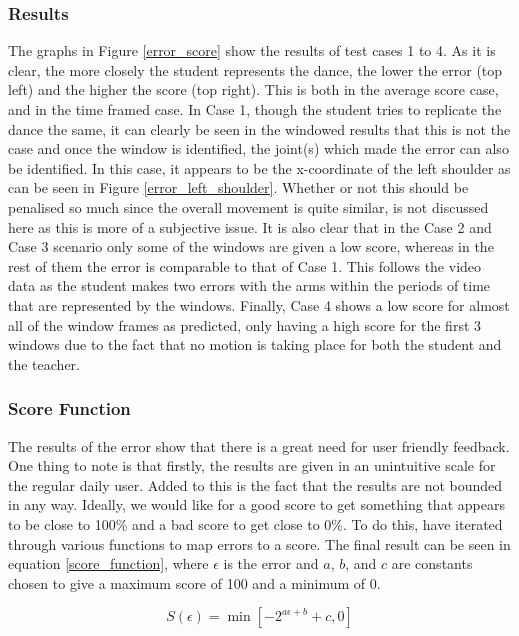 \documentclass[11pt,a4paper]{article}
\begin{document}
\subsubsection{Results}
\noindent
The graphs in Figure \ref{error_score} show the results of test cases 1 to 4. As it is clear, the more closely the student represents the dance, the lower the error (top left) and the higher the score (top right). This is both in the average score case, and in the time framed case. In Case 1, though the student tries to replicate the dance the same, it can clearly be seen in the windowed results that this is not the case and once the window is identified, the joint(s) which made the error can also be identified. In this case, it appears to be the x-coordinate of the left shoulder as can be seen in Figure \ref{error_left_shoulder}. Whether or not this should be penalised so much since the overall movement is quite similar, is not discussed here as this is more of a subjective issue. It is also clear that in the Case 2 and Case 3 scenario only some of the windows are given a low score, whereas in the rest of them the error is comparable to that of Case 1. This follows the video data as the student makes two errors with the arms within the periods of time that are represented by the windows. Finally, Case 4 shows a low score for almost all of the window frames as predicted, only having a high score for the first 3 windows due to the fact that no motion is taking place for both the student and the teacher. 

\subsubsection{Score Function}
\noindent
The results of the error show that there is a great need for user friendly feedback. One thing to note is that firstly, the results are given in an unintuitive scale for the regular daily user. Added to this is the fact that the results are not bounded in any way. Ideally, we would like for a good score to get something that appears to be close to 100\% and a bad score to get close to 0\%. To do this, have iterated through various functions to map errors to a score. The final result can be seen in equation \eqref{score_function}, where $\epsilon$ is the error and $a$, $b$, and $c$ are constants chosen to give a maximum score of 100 and a minimum of 0.

 
\begin{equation}
S(\epsilon) = \min\left[ -2^{a\epsilon + b}+c, 0 \right]
\end{equation}
\end{document}
